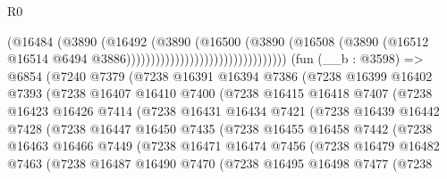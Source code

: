 \begin{lexlean}{R0}
\begin{coremodule}
                                                    (@16484
                                                      (@3890
                                                        (@16492
                                                          (@3890
                                                            (@16500
                                                              (@3890
                                                                (@16508
                                                                  (@3890
                                                                    (@16512
                                                                      @16514
                                                                      @6494
                                                                      @3886)))))))))))))))))))))))))))))))))
    (fun (__b : @3598) =>
    @6854
      (@7240
        @7379
        (@7238
          @16391
          @16394
          @7386
          (@7238
            @16399
            @16402
            @7393
            (@7238
              @16407
              @16410
              @7400
              (@7238
                @16415
                @16418
                @7407
                (@7238
                  @16423
                  @16426
                  @7414
                  (@7238
                    @16431
                    @16434
                    @7421
                    (@7238
                      @16439
                      @16442
                      @7428
                      (@7238
                        @16447
                        @16450
                        @7435
                        (@7238
                          @16455
                          @16458
                          @7442
                          (@7238
                            @16463
                            @16466
                            @7449
                            (@7238
                              @16471
                              @16474
                              @7456
                              (@7238
                                @16479
                                @16482
                                @7463
                                (@7238
                                  @16487
                                  @16490
                                  @7470
                                  (@7238
                                    @16495
                                    @16498
                                    @7477
                                    (@7238

\end{coremodule}
\end{lexlean}

